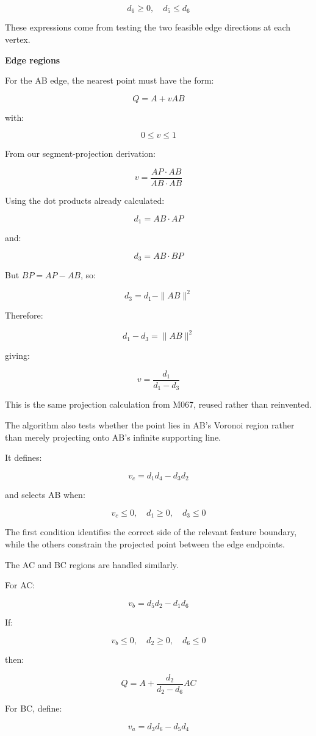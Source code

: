 \[
\boxed{d_6\ge0,\quad d_5\le d_6}
\]

These expressions come from testing the two feasible edge directions at each vertex.

\textbf{Edge regions}

For the AB edge, the nearest point must have the form:

\[
Q=A+vAB
\]

with:

\[
0\le v\le1
\]

From our segment-projection derivation:

\[
v=\frac{AP\cdot AB}{AB\cdot AB}
\]

Using the dot products already calculated:

\[
d_1=AB\cdot AP
\]

and:

\[
d_3=AB\cdot BP
\]

But \(BP=AP-AB\), so:

\[
d_3=d_1-\|AB\|^2
\]

Therefore:

\[
d_1-d_3=\|AB\|^2
\]

giving:

\[
\boxed{v=\frac{d_1}{d_1-d_3}}
\]

This is the same projection calculation from M067, reused rather than reinvented.

The algorithm also tests whether the point lies in AB's Voronoi region rather than merely projecting onto AB's infinite supporting line.

It defines:

\[
v_c=d_1d_4-d_3d_2
\]

and selects AB when:

\[
v_c\le0,\quad d_1\ge0,\quad d_3\le0
\]

The first condition identifies the correct side of the relevant feature boundary, while the others constrain the projected point between the edge endpoints.

The AC and BC regions are handled similarly.

For AC:

\[
v_b=d_5d_2-d_1d_6
\]

If:

\[
v_b\le0,\quad d_2\ge0,\quad d_6\le0
\]

then:

\[
\boxed{ Q=A+\frac{d_2}{d_2-d_6}AC }
\]

For BC, define:

\[
v_a=d_3d_6-d_5d_4
\]

